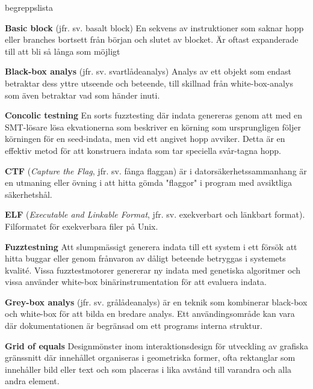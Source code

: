 \begin{labeling}{begreppslista}

    \item[\textbf{Basic block}] (jfr. sv. basalt block) En sekvens av instruktioner som saknar
    hopp eller branches bortsett från början och slutet av
    blocket. Är oftast expanderade till att bli så långa som möjligt

    \item [\textbf{Black-box analys}] (jfr. sv. svartlådeanalys) Analys av ett objekt som endast betraktar dess
    yttre utseende och beteende, till skillnad från white-box-analys som även
    betraktar vad som händer inuti.

    \item [\textbf{Concolic testning}] En sorts fuzztesting där indata genereras
    genom att med en SMT-lösare lösa ekvationerna som beskriver en körning som
    ursprungligen följer körningen för en seed-indata, men vid ett angivet
    hopp avviker. Detta är en effektiv metod för att konstruera indata som tar
    speciella svår-tagna hopp.

    \item [\textbf{CTF}] (\emph{Capture the Flag}, jfr. sv. fånga flaggan) är
    i datorsäkerhetssammanhang är en utmaning eller övning i att hitta gömda
    "flaggor" i program med avsiktliga säkerhetshål.

    \item [\textbf{ELF}] (\emph{Executable and Linkable Format}, jfr. sv. exekverbart och länkbart format). Filformatet för
    exekverbara filer på Unix.

    \item [\textbf{Fuzztestning}] Att slumpmässigt generera indata till ett system i
    ett försök att hitta buggar eller genom frånvaron av dåligt beteende
    betryggas i systemets kvalité. Vissa fuzztestmotorer genererar ny indata
    med genetiska algoritmer och vissa använder white-box binärinstrumentation
    för att evaluera indata.

    \item [\textbf{Grey-box analys}] (jfr. sv. grålådeanalys) är en teknik som kombinerar black-box och
    white-box för att bilda en bredare analys. Ett användingsområde kan vara där
    dokumentationen är begränsad om ett programs interna struktur.

    \item [\textbf{Grid of equals}] Designmönster inom interaktionsdesign för
    utveckling av grafiska gränssnitt där innehållet organiseras i geometriska
    former, ofta rektanglar som innehåller bild eller text och som placeras i
    lika avstånd till varandra och alla andra element.


\end{labeling}
